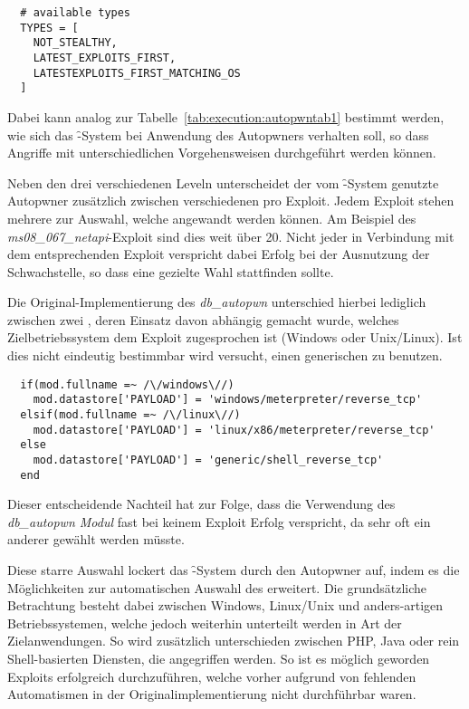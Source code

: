 \begin{lstlisting}
  # available types
  TYPES = [
    NOT_STEALTHY,
    LATEST_EXPLOITS_FIRST,
    LATESTEXPLOITS_FIRST_MATCHING_OS
  ]
\end{lstlisting}

Dabei kann analog zur Tabelle~\ref{tab:execution:autopwntab1} bestimmt
werden, wie sich das \f-System bei Anwendung des Autopwners verhalten
soll, so dass Angriffe mit unterschiedlichen Vorgehensweisen
durchgeführt werden können.

Neben den drei verschiedenen Leveln unterscheidet der vom
\f-System genutzte Autopwner zusätzlich zwischen verschiedenen
 pro Exploit.  Jedem Exploit stehen mehrere  zur
Auswahl, welche angewandt werden können. Am Beispiel des
\textit{ms08\_067\_netapi}-Exploit sind dies weit über 20. Nicht jeder
 in Verbindung mit dem entsprechenden Exploit verspricht dabei
Erfolg bei der Ausnutzung der Schwachstelle, so dass eine gezielte
Wahl stattfinden sollte.

Die Original-Implementierung des \textit{db\_autopwn} unterschied
hierbei lediglich zwischen zwei  , deren Einsatz davon
abhängig gemacht wurde, welches Zielbetriebssystem dem Exploit
zugesprochen ist (Windows oder Unix/Linux). Ist dies nicht eindeutig
bestimmbar wird versucht, einen generischen  zu benutzen.

\begin{lstlisting}
  if(mod.fullname =~ /\/windows\//)
    mod.datastore['PAYLOAD'] = 'windows/meterpreter/reverse_tcp'
  elsif(mod.fullname =~ /\/linux\//)
    mod.datastore['PAYLOAD'] = 'linux/x86/meterpreter/reverse_tcp'
  else
    mod.datastore['PAYLOAD'] = 'generic/shell_reverse_tcp'
  end
\end{lstlisting}

Dieser entscheidende Nachteil hat zur Folge, dass die Verwendung des
\textit{db\_autopwn Modul} fast bei keinem Exploit Erfolg verspricht,
da sehr oft ein anderer  gewählt werden müsste.

Diese starre Auswahl lockert das \f-System durch den Autopwner auf,
indem es die Möglichkeiten zur automatischen Auswahl des 
erweitert.  Die grundsätzliche Betrachtung besteht dabei zwischen
Windows, Linux/Unix und anders-artigen Betriebssystemen, welche jedoch
weiterhin unterteilt werden in Art der Zielanwendungen.  So wird
zusätzlich unterschieden zwischen PHP, Java oder rein Shell-basierten
Diensten, die angegriffen werden. So ist es möglich geworden Exploits
erfolgreich durchzuführen, welche vorher aufgrund von fehlenden
Automatismen in der Originalimplementierung nicht durchführbar waren.

